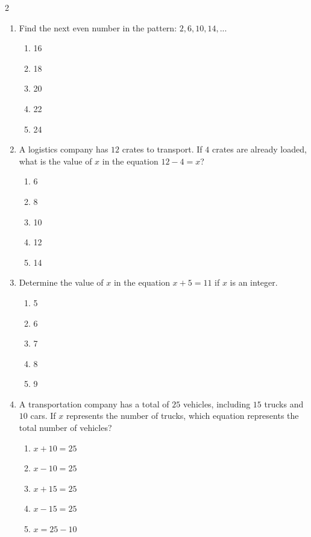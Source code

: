 \documentclass[10pt]{article}
\begin{document}
\begin{multicols}{2}
\begin{enumerate}[label=\textbf{Q\arabic*.}, leftmargin=*, itemsep=6pt, parsep=0pt]
  \item \small Find the next even number in the pattern: $2, 6, 10, 14, ...$
  \begin{enumerate}[label=(\Alph*), leftmargin=0.6cm, nosep, itemsep=2pt]
    \item 16
    \item 18
    \item 20
    \item 22
    \item 24
  \end{enumerate}

  \item \small A logistics company has $12$ crates to transport. If $4$ crates are already loaded, what is the value of $x$ in the equation $12 - 4 = x$?
  \begin{enumerate}[label=(\Alph*), leftmargin=0.6cm, nosep, itemsep=2pt]
    \item 6
    \item 8
    \item 10
    \item 12
    \item 14
  \end{enumerate}

  \item \small Determine the value of $x$ in the equation $x + 5 = 11$ if $x$ is an integer.
  \begin{enumerate}[label=(\Alph*), leftmargin=0.6cm, nosep, itemsep=2pt]
    \item 5
    \item 6
    \item 7
    \item 8
    \item 9
  \end{enumerate}

  \item \small A transportation company has a total of $25$ vehicles, including $15$ trucks and $10$ cars. If $x$ represents the number of trucks, which equation represents the total number of vehicles?
  \begin{enumerate}[label=(\Alph*), leftmargin=0.6cm, nosep, itemsep=2pt]
    \item $x + 10 = 25$
    \item $x - 10 = 25$
    \item $x + 15 = 25$
    \item $x - 15 = 25$
    \item $x = 25 - 10$
  \end{enumerate}


\end{enumerate}
\end{multicols}
\end{document}
